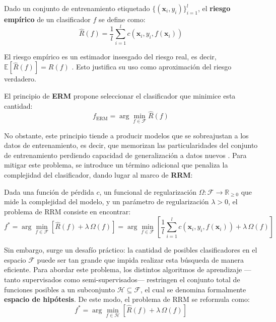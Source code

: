 \begin{defi}
\label{def:riesgo_empirico}
Dado un conjunto de entrenamiento etiquetado $\{(\mathbf{x}_i, y_i)\}_{i=1}^l$, el \textbf{riesgo empírico} de un clasificador $f$ se define como:
$$\hat{R}(f) = \frac{1}{l}\sum_{i=1}^{l} c(\mathbf{x}_i, y_i, f(\mathbf{x}_i))$$
\end{defi}

\begin{rema}
El riesgo empírico es un estimador insesgado del riesgo real, es decir, $\mathbb{E}[\hat{R}(f)] = R(f)$ \cite{mohri2018foundations}. Esto justifica su uso como aproximación del riesgo verdadero.
\end{rema}

El principio de \textbf{\gls{ERM}} propone seleccionar el clasificador que minimice esta cantidad:
\begin{equation}
\label{eq:erm}
    f_{\text{ERM}} = \arg\min_{f \in \mathcal{F}} \hat{R}(f)
\end{equation}

No obstante, este principio tiende a producir modelos que se sobreajustan a los datos de entrenamiento, es decir, que memorizan las particularidades del conjunto de entrenamiento perdiendo capacidad de generalización a datos nuevos \cite{mohri2018foundations}. Para mitigar este problema, se introduce un término adicional que penaliza la complejidad del clasificador, dando lugar al marco de \textbf{\gls{RRM}}:

\begin{defi}
\label{def:riesgo_regularizado}
Dada una función de pérdida $c$, un funcional de regularización $\Omega: \mathcal{F} \to \mathbb{R}_{\geq 0}$ que mide la complejidad del modelo, y un parámetro de regularización $\lambda > 0$, el problema de \gls{RRM} consiste en encontrar:
\begin{equation}
\label{eq:riesgo_regularizado}
    f^* = \arg\min_{f \in \mathcal{F}} \left[ \hat{R}(f) + \lambda\, \Omega(f) \right] = \arg\min_{f \in \mathcal{F}} \left[ \frac{1}{l}\sum_{i=1}^{l} c(\mathbf{x}_i, y_i, f(\mathbf{x}_i)) + \lambda\, \Omega(f) \right]
\end{equation}
\end{defi}

Sin embargo, surge un desafío práctico: la cantidad de posibles clasificadores en el espacio $\mathcal{F}$ puede ser tan grande que impida realizar esta búsqueda de manera eficiente. Para abordar este problema, los distintos algoritmos de aprendizaje —tanto supervisados como semi-supervisados— restringen el conjunto total de funciones posibles a un subconjunto $\mathcal{H} \subseteq \mathcal{F}$, el cual se denomina formalmente \textbf{espacio de hipótesis}. De este modo, el problema de \gls{RRM} se reformula como:
\begin{equation}
\label{eq:riesgo_regularizado_hipotesis}
    f^* = \arg\min_{f \in \mathcal{H}} \left[ \hat{R}(f) + \lambda\, \Omega(f) \right]
\end{equation}


